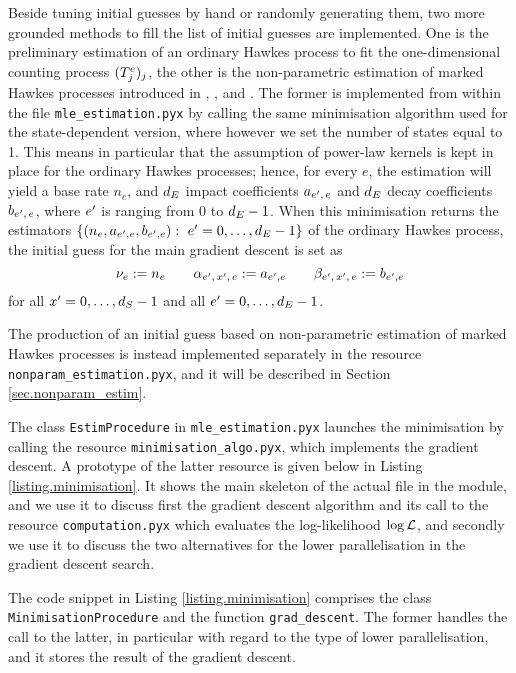 \documentclass[10pt, article,table]{article}
\begin{document}
Beside tuning initial guesses by hand or randomly generating them, two more grounded methods to fill the list of initial guesses are implemented. One is the preliminary estimation of an ordinary Hawkes process to fit the one-dimensional counting process $(\arrivalTimes[e]_j)_j$, the other is the non-parametric estimation of marked Hawkes processes introduced in \citealp{BM16fir}, \citealp{BM14haw}, and \citealp{BJM16est}. The former is implemented from within the file \texttt{mle\_estimation.pyx} by calling the same minimisation algorithm used for the state-dependent version, where however we set the number of states equal to 1. This means in particular that the assumption of power-law kernels is kept in place for the ordinary Hawkes processes; hence, for every $e$, the estimation will yield a base rate $n_e$, and $\numEventTypes$ impact coefficients $a\subscriptee$ and $\numEventTypes$ decay coefficients $b\subscriptee$, where $\eone$ is ranging from $0$ to $\numEventTypes-1$.  When this minimisation returns the estimators $\lbrace (n_e, a_{\eone,e}, b_{\eone,e}): \,\, \eone = 0, \dots,\numEventTypes-1\rbrace$ of the ordinary Hawkes process, the initial guess for the main gradient descent is set as
\begin{equation*}
 \baseRate_e := n_e
 \qquad
 \impCoef\subscriptexe := a_{\eone,e}
 \qquad
 \decCoef\subscriptexe := b_{\eone,e}
\end{equation*}
for all $\xone=0,\dots, \numStates -1$ and all $\eone=0,\dots, \numEventTypes -1$.

The production of an initial guess based on non-parametric estimation of marked Hawkes processes is instead implemented separately in the resource \texttt{nonparam\_estimation.pyx}, and it will be described in Section \ref{sec.nonparam_estim}.

The class \texttt{EstimProcedure} in \texttt{mle\_estimation.pyx} launches the minimisation by calling the resource \texttt{minimisation\_algo.pyx}, which implements the gradient descent. A prototype of the latter resource is given below in Listing \ref{listing.minimisation}. It shows the main skeleton of the actual file in the module, and we use it to discuss first the gradient descent algorithm and its call to the resource \texttt{computation.pyx} which evaluates the log-likelihood $\loglikelihood$, and secondly we use it to discuss the two alternatives for the lower parallelisation in the gradient descent search. 

The code snippet in Listing \ref{listing.minimisation} comprises the class \texttt{MinimisationProcedure} and the function \texttt{grad\_descent}. The former handles the call to the latter, in particular with regard to the type of lower parallelisation, and it stores the result of the gradient descent. 
\end{document}
